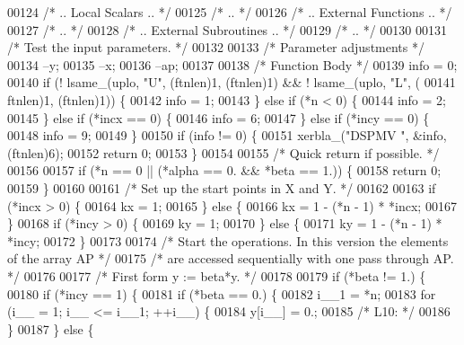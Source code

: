 \begin{DoxyCode}
00124 \textcolor{comment}{/*     .. Local Scalars .. */}
00125 \textcolor{comment}{/*     .. */}
00126 \textcolor{comment}{/*     .. External Functions .. */}
00127 \textcolor{comment}{/*     .. */}
00128 \textcolor{comment}{/*     .. External Subroutines .. */}
00129 \textcolor{comment}{/*     .. */}
00130 
00131 \textcolor{comment}{/*     Test the input parameters. */}
00132 
00133     \textcolor{comment}{/* Parameter adjustments */}
00134     --y;
00135     --x;
00136     --ap;
00137 
00138     \textcolor{comment}{/* Function Body */}
00139     info = 0;
00140     \textcolor{keywordflow}{if} (! lsame\_(uplo, \textcolor{stringliteral}{"U"}, (ftnlen)1, (ftnlen)1) && ! lsame\_(uplo, \textcolor{stringliteral}{"L"}, (
00141         ftnlen)1, (ftnlen)1)) \{
00142     info = 1;
00143     \} \textcolor{keywordflow}{else} \textcolor{keywordflow}{if} (*n < 0) \{
00144     info = 2;
00145     \} \textcolor{keywordflow}{else} \textcolor{keywordflow}{if} (*incx == 0) \{
00146     info = 6;
00147     \} \textcolor{keywordflow}{else} \textcolor{keywordflow}{if} (*incy == 0) \{
00148     info = 9;
00149     \}
00150     \textcolor{keywordflow}{if} (info != 0) \{
00151     xerbla\_(\textcolor{stringliteral}{"DSPMV "}, &info, (ftnlen)6);
00152     \textcolor{keywordflow}{return} 0;
00153     \}
00154 
00155 \textcolor{comment}{/*     Quick return if possible. */}
00156 
00157     \textcolor{keywordflow}{if} (*n == 0 || (*alpha == 0. && *beta == 1.)) \{
00158     \textcolor{keywordflow}{return} 0;
00159     \}
00160 
00161 \textcolor{comment}{/*     Set up the start points in  X  and  Y. */}
00162 
00163     \textcolor{keywordflow}{if} (*incx > 0) \{
00164     kx = 1;
00165     \} \textcolor{keywordflow}{else} \{
00166     kx = 1 - (*n - 1) * *incx;
00167     \}
00168     \textcolor{keywordflow}{if} (*incy > 0) \{
00169     ky = 1;
00170     \} \textcolor{keywordflow}{else} \{
00171     ky = 1 - (*n - 1) * *incy;
00172     \}
00173 
00174 \textcolor{comment}{/*     Start the operations. In this version the elements of the array AP */}
00175 \textcolor{comment}{/*     are accessed sequentially with one pass through AP. */}
00176 
00177 \textcolor{comment}{/*     First form  y := beta*y. */}
00178 
00179     \textcolor{keywordflow}{if} (*beta != 1.) \{
00180     \textcolor{keywordflow}{if} (*incy == 1) \{
00181         \textcolor{keywordflow}{if} (*beta == 0.) \{
00182         i\_\_1 = *n;
00183         \textcolor{keywordflow}{for} (i\_\_ = 1; i\_\_ <= i\_\_1; ++i\_\_) \{
00184             y[i\_\_] = 0.;
00185 \textcolor{comment}{/* L10: */}
00186         \}
00187         \} \textcolor{keywordflow}{else} \{

\end{DoxyCode}
